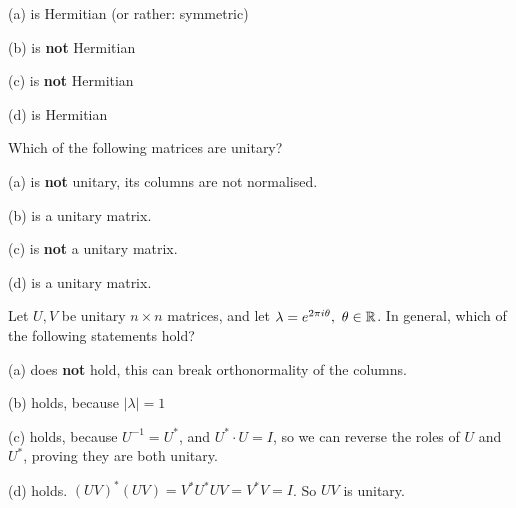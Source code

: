 \documentclass[12pt]{article}
\begin{document}
(a) is Hermitian (or rather: symmetric)

(b) is \textbf{not} Hermitian

(c) is \textbf{not} Hermitian

(d) is Hermitian

\begin{problem}{}{}
    Which of the following matrices are unitary?
\end{problem}

(a) is \textbf{not} unitary, its columns are not normalised.

(b) is a unitary matrix.

(c) is \textbf{not} a unitary matrix.

(d) is a unitary matrix.

\begin{problem}{}{}
    Let $U, V$ be unitary $n \times n$ matrices, and let $\lambda = e^{2\pi i \theta},\ \theta \in \mathbb{R}$. In general, which of the following statements hold?
\end{problem}

(a) does \textbf{not} hold, this can break orthonormality of the columns.

(b) holds, because $|\lambda| = 1$

(c) holds, because $U^{-1} = U^*$, and $U^* \cdot U = I$, so we can reverse the roles of $U$ and $U^*$, proving they are both unitary.

(d) holds. $(UV)^*(UV) = V^*U^*UV = V^* V = I$. So $UV$ is unitary.
\end{document}
